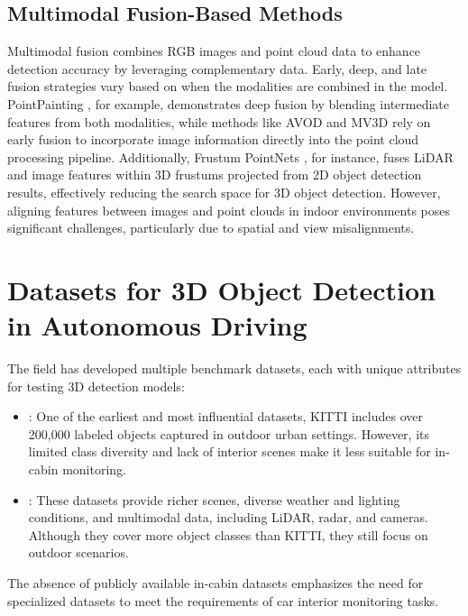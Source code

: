 \subsection{Multimodal Fusion-Based Methods}
Multimodal fusion combines RGB images and point cloud data to enhance detection 
accuracy by leveraging complementary data. Early, deep, and late fusion 
strategies vary based on when the modalities are combined in the model. 
PointPainting \cite{pointpainting}, for example, demonstrates 
deep fusion by blending intermediate features from both modalities, 
while methods like AVOD \cite{avod} and 
MV3D \cite{mv3d} 
rely on early fusion to incorporate image information directly into the point 
cloud processing pipeline. 
Additionally, Frustum PointNets \cite{frustum_pointnet}, for instance, 
fuses LiDAR and image features within 3D frustums projected from 2D object 
detection results, effectively reducing the search space for 3D object detection. 
However, aligning features between images and point clouds in indoor 
environments poses significant challenges, particularly due to spatial 
and view misalignments.



\section{Datasets for 3D Object Detection in Autonomous Driving}
The field has developed multiple benchmark datasets, each with unique attributes 
for testing 3D detection models:
\begin{itemize}
    \item {}: One of the earliest and most influential datasets, 
    KITTI \cite{kitti} 
    includes over 200,000 labeled objects captured in outdoor urban settings. 
    However, its limited class diversity and lack of interior scenes make it 
    less suitable for in-cabin monitoring.
    \item {} \cite{nuscenes} \cite{waymo}: 
    These datasets provide richer scenes, diverse weather and lighting 
    conditions, and multimodal data, including LiDAR, radar, and cameras. 
    Although they cover more object classes than KITTI, they still focus on 
    outdoor scenarios.
\end{itemize}
The absence of publicly available in-cabin datasets emphasizes the need 
for specialized datasets to meet the requirements of car interior 
monitoring tasks.


